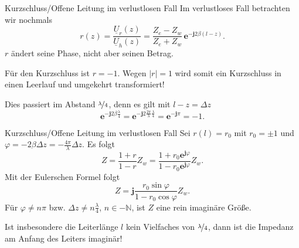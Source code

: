 \documentclass{beamer}
\begin{document}
\begin{frame}{Kurzschluss/Offene Leitung im verlustlosen Fall}
Im verlustloses Fall betrachten wir nochmals
\[
r(z) = \frac{\underline{U}_{r}(z)}{\underline{U}_{h}(z)} =
\frac{Z_{e}-Z_{w}}{Z_{e}+Z_{w}} \, \mathbf{e}^{-\mathbf{j} 2 \beta (l-z)}.
\]
$r$ ändert seine Phase, nicht aber seinen Betrag.
\vspace{1ex}

Für den Kurzschluss ist $r=-1$. Wegen $|r|=1$ wird somit ein Kurzschluss in einen Leerlauf und
umgekehrt transformiert!

\vspace{1ex}
Dies passiert im Abstand $\nicefrac{\lambda}{4}$, denn es gilt mit $l - z = \Delta z$
\[
\mathbf{e}^{- \mathbf{j} 2 \beta \frac{\lambda}{4}} =
\mathbf{e}^{- \mathbf{j} 2 \frac{2 \pi}{\lambda} \frac{\lambda}{4}} =
\mathbf{e}^{- \mathbf{j} \pi} = -1.
\]
\end{frame}


\begin{frame}{Kurzschluss/Offene Leitung im verlustlosen Fall}
Sei $r(l) = r_{0}$ mit $r_{0} = \pm 1$ und
$\varphi = - 2 \beta \Delta z = - \frac{4 \pi}{\lambda} \Delta z$.
Es folgt
\[
Z = \frac{1 + r}{1 - r} Z_{w} =
\frac{1 + r_{0} \mathbf{e}^{\mathbf{j} \varphi}}{1 - r_{0} \mathbf{e}^{\mathbf{j} \varphi}} Z_{w}.
\] Mit der Eulerschen Formel folgt
\[
Z = \mathbf{j} \frac{r_{0} \sin \varphi}{1 - r_{0} \cos \varphi} Z_{w}.
\]
Für $\varphi \ne n \pi$ bzw. $\Delta z \ne n \frac{\lambda}{4}$, $n \in - \mathbb{N}$, ist $Z$ eine
rein imaginäre Größe.

Ist insbesondere die Leiterlänge $l$ kein Vielfaches von $\nicefrac{\lambda}{4}$, dann ist die Impedanz am
Anfang des Leiters imaginär!
\end{frame}
\end{document}
